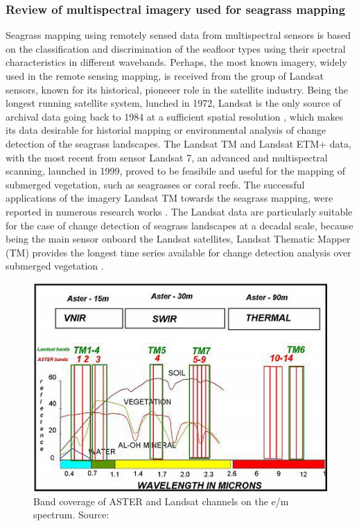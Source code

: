 \documentclass[10pt, a4paper]{article}
\begin{document}
\subsubsection{Review of multispectral imagery used for seagrass mapping}
Seagrass mapping using remotely sensed data from multispectral sensors is based on the classification
and discrimination of the seafloor types using their spectral characteristics in different wavebands.
Perhaps, the most known imagery, widely used in the remote sensing mapping, is received from the
group of Landsat sensors, known for its historical, pioneeer role in the satellite industry.
Being the longest running satellite system, lunched in 1972, Landsat is the only source of archival
data going back to 1984 at a sufficient spatial resolution \cite{Dekker05}\label{Dekker05}, which makes its data
desirable for historial mapping or environmental analysis of change detection of the seagrass
landscapes.
The Landsat TM and Landsat ETM+ data, with the most recent from sensor Landsat 7, an advanced
and multispectral scanning, launched in 1999, proved to be feasibile and useful for the mapping of
submerged vegetation, such as seagrasses or coral reefs. The successful applications of the imagery
Landsat TM towards the seagrass mapping, were reported in numerous research works \cite{Palandro03,Gullstroom06,Wabnitz08,Bierwirth93,Ferguson97,Rasib97}\label{Palandro03} \label{Gullstroom06} \label{Wabnitz08} \label{Bierwirth93} \label{Ferguson97} \label{Rasib97}. The Landsat data are particularly suitable for the
case of change detection of seagrass landscapes at a decadal scale, because being the main sensor
onboard the Landsat satellites, Landsat Thematic Mapper (TM) provides the longest time series
available for change detection analysis over submerged vegetation \cite{Palandro03}\label{Palandro03}.

\begin{figure}
	\centering
	\includegraphics[scale=0.35]{Fig-13.jpg}
 	\caption{Band coverage of ASTER and Landsat channels on the e/m spectrum. Source:\cite{Kalinowski04}\label{Kalinowski04}}
	\label{fig:13}
\end{figure}
\end{document}
